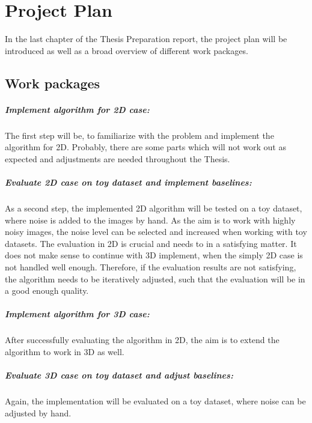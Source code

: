 \chapter{Project Plan}
\label{sec:projectPlan}
In the last chapter of the Thesis Preparation report, the project plan will be introduced as well as a broad overview of different 
work packages.

\section{Work packages}

\paragraph{Implement algorithm for 2D case:}
The first step will be, to familiarize with the problem and implement
the algorithm for 2D. Probably, there are some parts which will not work out as expected
and adjustments are needed throughout the Thesis.

\paragraph{Evaluate 2D case on toy dataset and implement baselines:}
As a second step, the implemented 2D algorithm will be tested on a toy dataset,
where noise is added to the images by hand. As the aim is to work with highly noisy images,
the noise level can be selected and increased when working with toy datasets. 
The evaluation in 2D is crucial and needs to in a satisfying matter. 
It does not make sense to continue with 3D implement, when the simply 2D case is not handled well enough.
Therefore, if the evaluation results are not satisfying, the algorithm needs to be iteratively adjusted, 
such that the evaluation will be in a good enough quality.


\paragraph{Implement algorithm for 3D case:}
After successfully evaluating the algorithm in 2D, the aim is to extend the algorithm to work in 3D as well.

\paragraph{Evaluate 3D case on toy dataset and adjust baselines:}
Again, the implementation will be evaluated on a toy dataset, where noise can be adjusted by hand.


